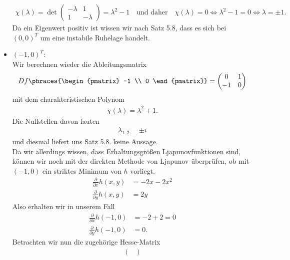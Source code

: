 \begin{solution}
\begin{itemize}
    \begin{align*}
      \chi(\lambda) = \det \begin{pmatrix}
        -\lambda & 1 \\
        1 & -\lambda
      \end{pmatrix}
      = \lambda^2 - 1 \quad \textrm{und daher} \quad \chi(\lambda) = 0 \Leftrightarrow \lambda^2 - 1 = 0 \Leftrightarrow \lambda = \pm 1.
    \end{align*}
    Da ein Eigenwert positiv ist wissen wir nach Satz 5.8, dass es sich bei $(0, 0)^T$ um eine instabile Ruhelage handelt.
    \item $(-1, 0)^T$: \\
    Wir berechnen wieder die Ableitungsmatrix
    \begin{align*}
    Df\pbraces{\begin{pmatrix}
      -1 \\ 0
    \end{pmatrix}}
    =
    \begin{pmatrix}
      0 & 1 \\
      -1 & 0
    \end{pmatrix}
    \end{align*}
    mit dem charakteristischen Polynom
    \begin{align*}
      \chi(\lambda) = \lambda^2 + 1.
    \end{align*}
    Die Nullstellen davon lauten
    \begin{align*}
      \lambda_{1,2} = \pm i
    \end{align*}
    und diesmal liefert uns Satz 5.8. keine Aussage. \\
    Da wir allerdings wissen, dass Erhaltungsgrößen
    Ljapunovfunktionen sind, können wir noch mit der direkten Methode von Ljapunov
    überprüfen, ob mit $(-1,0)$
    ein striktes Minimum von $h$ vorliegt.
    \begin{align*}
      \frac{\partial}{\partial x}h(x,y) &= -2x - 2x^2 \\
       \frac{\partial}{\partial y}h(x,y) &= 2y
    \end{align*}
    Also erhalten wir in unserem Fall
    \begin{align*}
    \frac{\partial}{\partial x}h(-1,0) &= -2 + 2 = 0 \\
     \frac{\partial}{\partial y}h(-1,0) &= 0.
    \end{align*}
    Betrachten wir nun die zugehörige Hesse-Matrix
    \begin{align*}
      \begin{pmatrix}

\end{pmatrix}
\end{align*}
\end{itemize}
\end{solution}
